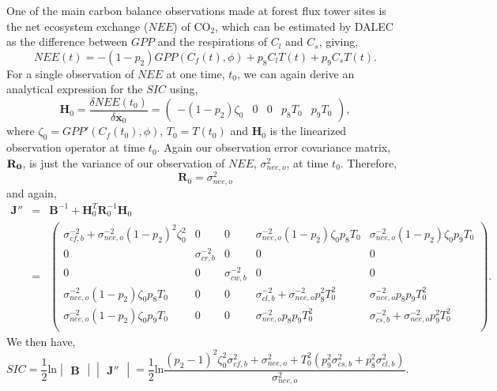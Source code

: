 \documentclass[11pt]{article}
\begin{document}
One of the main carbon balance observations made at forest flux tower sites is the net ecosystem exchange ($NEE$) of CO$_{2}$, which can be estimated by DALEC as the difference between $GPP$ and the respirations of $C_l$ and $C_s$, giving,
\begin{equation}
NEE(t)=-(1-p_2)GPP(C_f(t),\phi)+p_8C_lT(t)+p_9C_sT(t). \label{neeeqn}
\end{equation}
For a single observation of $NEE$ at one time, $t_0$, we can again derive an analytical expression for the $SIC$ using,
\begin{equation}
\mathbf{H}_{0}=\frac{\delta NEE(t_0)}{\delta\textbf{x}_0} = \begin{pmatrix}
-(1-p_{2})\zeta_0 & 0 & 0 & p_{8}T_{0} & p_{9}T_{0}
\end{pmatrix},
\end{equation}
where $\zeta_0 = GPP'(C_f(t_0), \phi)$, $T_{0}=T(t_0)$ and $\mathbf{H}_{0}$ is the linearized observation operator at time $t_0$. Again our observation error covariance matrix, $\bf{R}_0$, is just the variance of our observation of $NEE$, $\sigma_{nee,o}^{2}$, at time $t_0$. Therefore,
\begin{equation}
\mathbf{R}_0=\sigma_{nee,o}^{2}
\end{equation}
and again,
\begin{equation}
\begin{array} {lcl}
\mathbf{J}'' &=& \mathbf{B}^{-1}+\mathbf{H}_0^{T}\mathbf{R}_0^{-1}\mathbf{H}_0 \\
&=& \begin{pmatrix} 
\sigma_{cf,b}^{-2}+\sigma_{nee,o}^{-2}(1-p_{2})^{2}\zeta_0^{2} & 0 & 0 & \sigma_{nee,o}^{-2}(1-p_{2})\zeta_0 p_{8}T_0 & \sigma_{nee,o}^{-2}(1-p_{2})\zeta_0 p_{9}T_0 \\
0 & \sigma_{cr,b}^{-2} & 0 & 0 & 0 \\
0 & 0 & \sigma_{cw,b}^{-2} & 0 & 0 \\
\sigma_{nee,o}^{-2}(1-p_{2})\zeta_0 p_{8}T_0 & 0 & 0 & \sigma_{cl,b}^{-2}+\sigma_{nee,o}^{-2}p_{8}^2 T_0^2 & \sigma_{nee,o}^{-2}p_{8}p_{9} T_0^2 \\
\sigma_{nee,o}^{-2}(1-p_{2})\zeta_0 p_{9}T_0 & 0 & 0 & \sigma_{nee,o}^{-2}p_{8}p_{9} T_0^2 & \sigma_{cs,b}^{-2}+\sigma_{nee,o}^{-2}p_{9}^2 T_0^2 \\
\end{pmatrix}.
\end{array}
\end{equation} 
We then have,
\begin{equation}
SIC = \frac{1}{2}\text{ln}\begin{vmatrix} \mathbf{B} \end{vmatrix}\begin{vmatrix} \mathbf{J}'' \end{vmatrix} = \frac{1}{2}\text{ln}\frac{(p_{2}-1)^{2}\zeta_0^{2}\sigma_{cf,b}^{2}+\sigma_{nee,o}^{2}+T_{0}^2(p_{9}^2\sigma_{cs,b}^2+p_8^2\sigma_{cl,b}^2)}{\sigma_{nee,o}^{2}}.
\end{equation}
\end{document}

